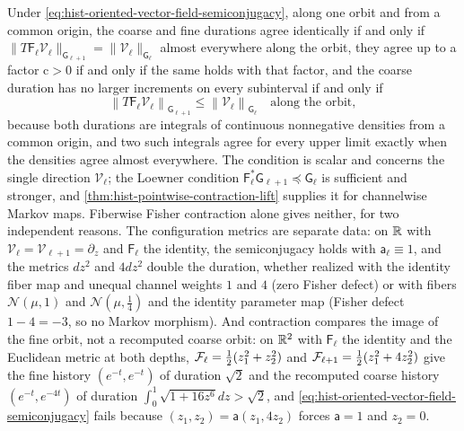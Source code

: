 Under \eqref{eq:hist-oriented-vector-field-semiconjugacy}, along one orbit and from a
common origin, the coarse and fine durations agree identically if and only if
$\lVert T\mathsf F_\ell\mathscr V_\ell\rVert_{\mathsf G_{\ell+1}}=\lVert\mathscr
V_\ell\rVert_{\mathsf G_\ell}$ almost everywhere along the orbit, they agree up to a
factor $\mathrm c>0$ if and only if the same holds with that factor, and the coarse
duration has no larger increments on every subinterval if and only if
\begin{equation}
\left\lVert T\mathsf F_\ell\mathscr V_\ell\right\rVert_{\mathsf G_{\ell+1}}
\leq\left\lVert\mathscr V_\ell\right\rVert_{\mathsf G_\ell}
\quad\text{along the orbit},
\label{eq:hist-duration-criterion}
\end{equation}
because both durations are integrals of continuous nonnegative densities from a common
origin, and two such integrals agree for every upper limit exactly when the densities
agree almost everywhere.  The condition is scalar and concerns the single direction
$\mathscr V_\ell$; the Loewner condition $\mathsf F_\ell^*\mathsf G_{\ell+1}\preceq\mathsf
G_\ell$ is sufficient and stronger, and \cref{thm:hist-pointwise-contraction-lift}
supplies it for channelwise Markov maps.  Fiberwise Fisher contraction alone gives
neither, for two independent reasons.  The configuration metrics are separate data: on
$\mathbb R$ with $\mathscr V_\ell=\mathscr V_{\ell+1}=\partial_z$ and $\mathsf F_\ell$ the
identity, the semiconjugacy holds with $\mathsf a_\ell\equiv1$, and the metrics $dz^2$
and $4dz^2$ double the duration, whether realized with the identity fiber map and unequal
channel weights $1$ and $4$ (zero Fisher defect) or with fibers $\mathcal N(\mu,1)$ and
$\mathcal N(\mu,\tfrac14)$ and the identity parameter map (Fisher defect $1-4=-3$, so no
Markov morphism).  And contraction compares the image of the fine orbit, not a recomputed
coarse orbit: on $\mathbb R^2$ with $\mathsf F_\ell$ the identity and the Euclidean metric at
both depths, $\mathcal F_\ell=\tfrac12(z_1^2+z_2^2)$ and
$\mathcal F_{\ell+1}=\tfrac12(z_1^2+4z_2^2)$ give the fine history $(e^{-t},e^{-t})$ of
duration $\sqrt2$ and the recomputed coarse history $(e^{-t},e^{-4t})$ of duration
$\int_0^1\sqrt{1+16z^6} dz>\sqrt2$, and
\eqref{eq:hist-oriented-vector-field-semiconjugacy} fails because
$(z_1,z_2)=\mathsf a(z_1,4z_2)$ forces $\mathsf a=1$ and $z_2=0$.  


